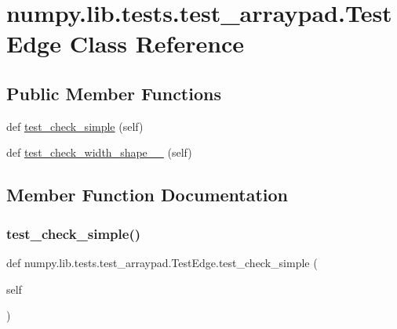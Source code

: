 \hypertarget{classnumpy_1_1lib_1_1tests_1_1test__arraypad_1_1TestEdge}{}\section{numpy.\+lib.\+tests.\+test\+\_\+arraypad.\+Test\+Edge Class Reference}
\label{classnumpy_1_1lib_1_1tests_1_1test__arraypad_1_1TestEdge}
\subsection*{Public Member Functions}
\begin{DoxyCompactItemize}
\item 
def \hyperlink{classnumpy_1_1lib_1_1tests_1_1test__arraypad_1_1TestEdge_a36c0a8b079b9fd3fb983e1153aa2806e}{test\+\_\+check\+\_\+simple} (self)
\item 
def \hyperlink{classnumpy_1_1lib_1_1tests_1_1test__arraypad_1_1TestEdge_a691802f99fd1aa10c8dc73d64fcdcccc}{test\+\_\+check\+\_\+width\+\_\+shape\+\_\+\_} (self)
\end{DoxyCompactItemize}


\subsection{Member Function Documentation}
\mbox{\label{classnumpy_1_1lib_1_1tests_1_1test__arraypad_1_1TestEdge_a36c0a8b079b9fd3fb983e1153aa2806e}} 
\subsubsection{\texorpdfstring{test\+\_\+check\+\_\+simple()}{test\_check\_simple()}}
{\footnotesize\ttfamily def numpy.\+lib.\+tests.\+test\+\_\+arraypad.\+Test\+Edge.\+test\+\_\+check\+\_\+simple (\begin{DoxyParamCaption}\item[{}]{self }\end{DoxyParamCaption})}


